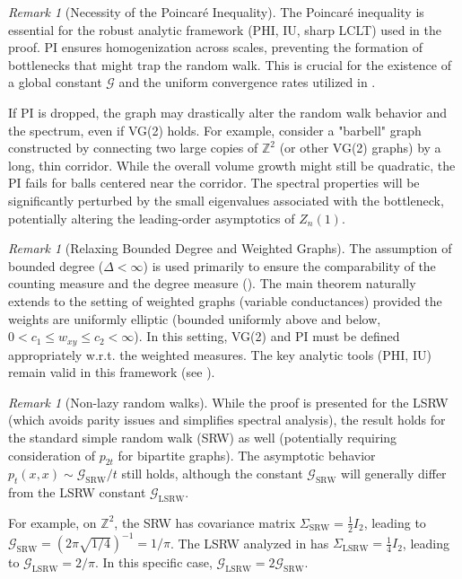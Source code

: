 \documentclass{article}
\numberwithin{equation}{section}
\theoremstyle{definition}
\theoremstyle{remark}
\newtheorem{remark}[theorem]{Remark}
\newcommand{\cG}{\mathcal{G}}    %
\begin{document}
\begin{remark}[Necessity of the Poincaré Inequality]
The Poincaré inequality is essential for the robust analytic framework (PHI, IU, sharp LCLT) used in the proof. PI ensures homogenization across scales, preventing the formation of bottlenecks that might trap the random walk. This is crucial for the existence of a global constant $\cG$ and the uniform convergence rates utilized in .

If PI is dropped, the graph may drastically alter the random walk behavior and the spectrum, even if VG(2) holds. For example, consider a "barbell" graph constructed by connecting two large copies of $\mathbb{Z}^2$ (or other VG(2) graphs) by a long, thin corridor. While the overall volume growth might still be quadratic, the PI fails for balls centered near the corridor. The spectral properties will be significantly perturbed by the small eigenvalues associated with the bottleneck, potentially altering the leading-order asymptotics of $Z_n(1)$.
\end{remark}

\begin{remark}[Relaxing Bounded Degree and Weighted Graphs]
The assumption of bounded degree ($\Delta < \infty$) is used primarily to ensure the comparability of the counting measure and the degree measure (). The main theorem naturally extends to the setting of weighted graphs (variable conductances) provided the weights are uniformly elliptic (bounded uniformly above and below, $0 < c_1 \leq w_{xy} \leq c_2 < \infty$). In this setting, VG(2) and PI must be defined appropriately w.r.t. the weighted measures. The key analytic tools (PHI, IU) remain valid in this framework (see \cite{Delmotte99}).
\end{remark}

\begin{remark}[Non-lazy random walks]\label{rem:non-lazy}
While the proof is presented for the LSRW (which avoids parity issues and simplifies spectral analysis), the result holds for the standard simple random walk (SRW) as well (potentially requiring consideration of $p_{2t}$ for bipartite graphs). The asymptotic behavior $p_t(x,x) \sim \cG_{\text{SRW}}/t$ still holds, although the constant $\cG_{\text{SRW}}$ will generally differ from the LSRW constant $\cG_{\text{LSRW}}$.

For example, on $\mathbb{Z}^2$, the SRW has covariance matrix $\Sigma_{\text{SRW}} = \frac{1}{2} I_2$, leading to $\cG_{\text{SRW}} = (2\pi\sqrt{1/4})^{-1} = 1/\pi$. The LSRW analyzed in  has $\Sigma_{\text{LSRW}} = \frac{1}{4} I_2$, leading to $\cG_{\text{LSRW}} = 2/\pi$. In this specific case, $\cG_{\text{LSRW}}=2\cG_{\text{SRW}}$.
\end{remark}
\end{document}
